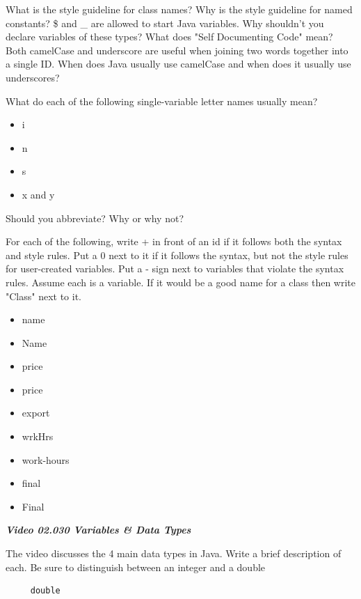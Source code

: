 \documentclass[letterpaper,11pt]{exam}
\newcommand{\videoheading}[1]{\Large\textbf{\textit{#1}}}
\begin{document}
\begin{questions}
\question What is the style guideline for class names?
\question Why is the style guideline for named constants?
\question \$ and \_ are allowed to start Java variables.  Why shouldn't you declare variables of these types?
\question What does "Self Documenting Code" mean?
\question Both camelCase and underscore are useful when joining two words together into a single ID.  When does Java usually use camelCase and when does it usually use underscores?
\begin{samepage}
\question What do each of the following single-variable letter names usually mean?
\begin{itemize} 
  \item i
  \item n
  \item s
  \item x and y
\end{itemize}
\end{samepage}
\question Should you abbreviate?  Why or why not?\\

\begin{samepage}
\question  For each of the following, write + in front of an id if it follows both the syntax and style rules.  Put a 0 next to it if it follows the syntax, but not the style rules for user-created variables.  Put a - sign next to variables that violate the syntax rules.  Assume each is a variable.  If it would be a good name for a class then write "Class" next to it.
\begin{itemize}
  \item  name 
  \item  Name 
  \item  price 
  \item  price 
  \item  export
  \item  wrkHrs
  \item  work-hours
  \item  final
  \item  Final
\end{itemize}
\end{samepage}

\videoheading{Video 02.030 Variables \& Data Types}

\begin{samepage}
\question The video discusses the 4 main data types in Java.  Write a brief description of each.  Be sure to distinguish between an integer and a double
\end{samepage}
\begin{samepage}
\begin{verbatim}
     double


\end{verbatim}
\end{samepage}
\end{questions}
\end{document}
